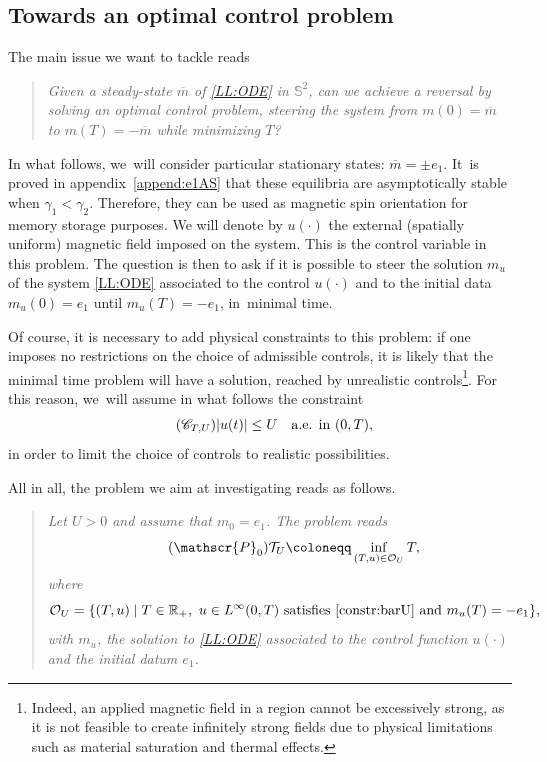 \documentclass[10pt]{amsart}
\theoremstyle{definition}
\newcommand{\R} {\mathbb{R}}
\begin{document}
\subsection{Towards an optimal control problem}\label{sec:OCP}

The main issue we want to tackle reads
\begin{quote}
\textit{Given a steady-state $\overline{m}$ of \eqref{LL:ODE} in $\mathbb{S}^2$, can we achieve a reversal by solving an optimal control problem, \ie steering the system from $m(0)=\overline{m}$ to $m(T)=-\overline{m}$ while minimizing $T$?}
\end{quote}
In what follows, we~will consider particular stationary states: $\overline{m}=\pm e_1$. It~is proved in appendix~\ref{append:e1AS} that these equilibria are asymptotically stable when $\gamma_1 < \gamma_2$. Therefore, they can be used as magnetic spin orientation for memory storage purposes.
We will denote by $u(\cdot)$ the external (spatially uniform) magnetic field imposed on the system. This is the control variable in this problem. The question is then to ask if it is possible to steer the solution $m_u$ of the system \eqref{LL:ODE} associated to the control $u(\cdot)$ and to the initial data $m_u(0)=e_1$ until $m_u(T)=-e_1$, in~minimal time.

Of course, it is necessary to add physical constraints to this problem: if one imposes no restrictions on the choice of admissible controls, it is likely that the minimal time problem will have a solution, reached by unrealistic controls\footnote{{Indeed, an applied magnetic field in a region cannot be excessively strong, as it is not feasible to create infinitely strong fields due to physical limitations such as material saturation and thermal effects. }}.
For this reason, we~will assume in what follows the constraint
\begin{equation}\label{constr:barU}\tag{$\mathscr{C}_{T,U }$}
|u(t)|\leq U \quad \text{a.e. in }(0,T),
\end{equation}
in order to limit the choice of controls to realistic possibilities.

All in all, the problem we aim at investigating reads as follows.

\begin{quote}
\textit{Let $U >0$ and assume that $m_0=e_1$. The problem reads
\begin{equation}\label{OCP:minT}\tag{$\mathscr{P}_0$}
\mathcal{T}_{U } \coloneqq \inf_{(T,u)\in \mathcal{O}_{U }}T,
\end{equation}
where
\[
\mathcal{O}_{U }=\{(T,u)\mid T\in \R_+, \ u\in L^\infty(0,T)\text{ satisfies }\eqref{constr:barU}\text{ and }m_u(T)=-e_1\},
\]
with $m_u$, the solution to \eqref{LL:ODE} associated to the control function $u(\cdot)$ and the initial datum $e_1$.}
\end{quote}
\end{document}

